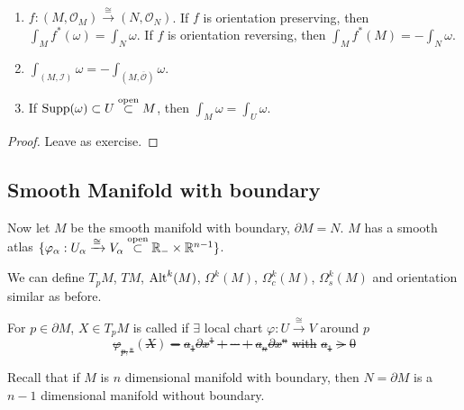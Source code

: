 \begin{proposition}
    \,
    \begin{enumerate}
        \item  $ f:(M,\mathcal{O}_M)\xrightarrow{\cong}(N,\mathcal{O}_N) $. If  $ f $ is orientation preserving, then  $ \int_Mf^*(\omega)=\int_N\omega $. If  $ f $ is orientation reversing, then  $ \int_Mf^*(M)=-\int_N\omega $. 
        \item  $ \int_(M,\mathcal{I})\omega=-\int_{(M,\overline{\mathcal{O}})}\omega $.
        \item If  $ \mathrm{Supp}(\omega)\subset U\overset{\text{open}}{\subset} M $, then  $ \int_M\omega=\int_U\omega $.       
    \end{enumerate}
\end{proposition}
\begin{proof}
    Leave as exercise.
\end{proof}

\subsection{Smooth Manifold with boundary}
Now let  $ M $ be the smooth manifold with boundary,  $ \partial M=N $. \ie  $ M $ has a smooth atlas  $ \{\varphi_\alpha:U_\alpha\xrightarrow{\cong}V_\alpha\overset{\text{open}}{\subset}\mathbb R_{-}\times\mathbb R^{n-1}\} $.

We can define  $ T_pM $,  $ TM $, $ \mathrm{Alt}^k(M) $, $ \Omega^k(M) $,  $ \Omega_c^k(M) $,  $ \Omega_s^k(M) $ and orientation similar as before.

For  $ p\in\partial M $,  $ X\in T_pM $ is called   if  $ \exists $ local chart  $ \varphi:U\xrightarrow{\cong}V $ around  $ p $ \st 
\[\varphi_{p,*}(X)=a_1\partial x^1+\cdots+a_n\partial x^n\text{ with }a_1>0\]   

Recall that if  $ M $ is  $ n $ dimensional manifold with boundary, then  $ N=\partial M $ is a  $ n-1 $ dimensional manifold without boundary.  

